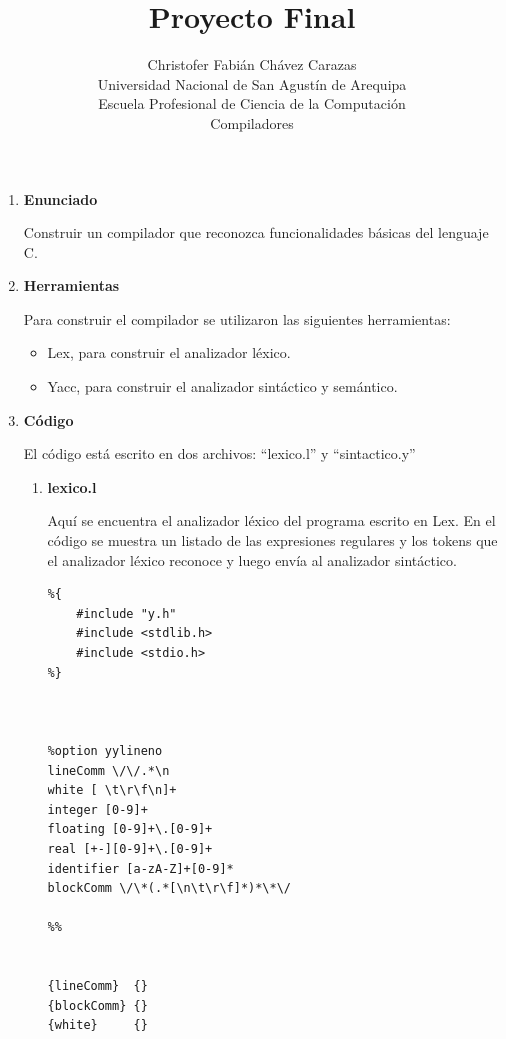 \documentclass[a4paper,12pt]{article}
\begin{document}
\title{Proyecto Final}
\author{
Christofer Fabián Chávez Carazas \\
\small{Universidad Nacional de San Agustín de Arequipa} \\
\small{Escuela Profesional de Ciencia de la Computación} \\
\small{Compiladores}
}
\date{}

\maketitle

\begin{enumerate}
 \item \textbf{Enunciado}
 
 Construir un compilador que reconozca funcionalidades básicas del lenguaje C.
 
 \item \textbf{Herramientas}
 
 Para construir el compilador se utilizaron las siguientes herramientas:
 \begin{itemize}
  \item Lex, para construir el analizador léxico.
  \item Yacc, para construir el analizador sintáctico y semántico.
 \end{itemize}
 
 \item \textbf{Código}
 
 El código está escrito en dos archivos: ``lexico.l'' y ``sintactico.y''
 
 \begin{enumerate}
  \item \textbf{lexico.l}
  
  Aquí se encuentra el analizador léxico del programa escrito en Lex. En el código se muestra un listado de las expresiones regulares y los tokens que
  el analizador léxico reconoce y luego envía al analizador sintáctico.
  
  \begin{lstlisting}
%{
	#include "y.h"
	#include <stdlib.h>
	#include <stdio.h>
%}



%option yylineno
lineComm \/\/.*\n
white [ \t\r\f\n]+
integer [0-9]+
floating [0-9]+\.[0-9]+
real [+-][0-9]+\.[0-9]+
identifier [a-zA-Z]+[0-9]*
blockComm \/\*(.*[\n\t\r\f]*)*\*\/

%%


{lineComm}  {}
{blockComm} {}
{white} 	{}


\end{lstlisting}
\end{enumerate}
\end{enumerate}
\end{document}
